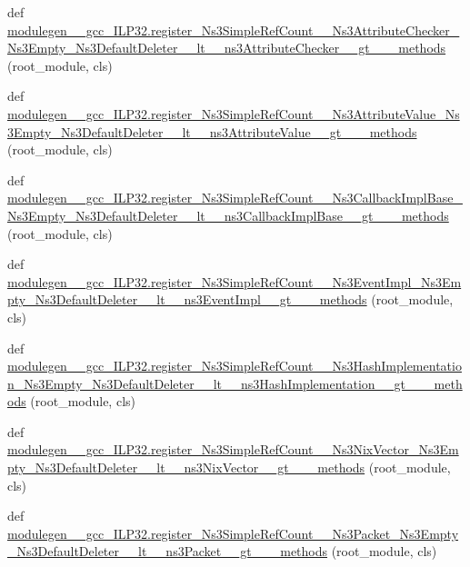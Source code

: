 \begin{DoxyCompactItemize}
\item 
def \hyperlink{namespacemodulegen____gcc__ILP32_a8e35760026d969bed52bf02d5751f184}{modulegen\+\_\+\+\_\+gcc\+\_\+\+I\+L\+P32.\+register\+\_\+\+Ns3\+Simple\+Ref\+Count\+\_\+\+\_\+\+Ns3\+Attribute\+Checker\+\_\+\+Ns3\+Empty\+\_\+\+Ns3\+Default\+Deleter\+\_\+\+\_\+lt\+\_\+\+\_\+ns3\+Attribute\+Checker\+\_\+\+\_\+gt\+\_\+\+\_\+\+\_\+methods} (root\+\_\+module, cls)
\item 
def \hyperlink{namespacemodulegen____gcc__ILP32_ae37f0969d06fd5e11e962c9b2a58d222}{modulegen\+\_\+\+\_\+gcc\+\_\+\+I\+L\+P32.\+register\+\_\+\+Ns3\+Simple\+Ref\+Count\+\_\+\+\_\+\+Ns3\+Attribute\+Value\+\_\+\+Ns3\+Empty\+\_\+\+Ns3\+Default\+Deleter\+\_\+\+\_\+lt\+\_\+\+\_\+ns3\+Attribute\+Value\+\_\+\+\_\+gt\+\_\+\+\_\+\+\_\+methods} (root\+\_\+module, cls)
\item 
def \hyperlink{namespacemodulegen____gcc__ILP32_a1725745354fc64e505a347b59ad09428}{modulegen\+\_\+\+\_\+gcc\+\_\+\+I\+L\+P32.\+register\+\_\+\+Ns3\+Simple\+Ref\+Count\+\_\+\+\_\+\+Ns3\+Callback\+Impl\+Base\+\_\+\+Ns3\+Empty\+\_\+\+Ns3\+Default\+Deleter\+\_\+\+\_\+lt\+\_\+\+\_\+ns3\+Callback\+Impl\+Base\+\_\+\+\_\+gt\+\_\+\+\_\+\+\_\+methods} (root\+\_\+module, cls)
\item 
def \hyperlink{namespacemodulegen____gcc__ILP32_a8101c8d46fb3608fb9b8e22e680f1793}{modulegen\+\_\+\+\_\+gcc\+\_\+\+I\+L\+P32.\+register\+\_\+\+Ns3\+Simple\+Ref\+Count\+\_\+\+\_\+\+Ns3\+Event\+Impl\+\_\+\+Ns3\+Empty\+\_\+\+Ns3\+Default\+Deleter\+\_\+\+\_\+lt\+\_\+\+\_\+ns3\+Event\+Impl\+\_\+\+\_\+gt\+\_\+\+\_\+\+\_\+methods} (root\+\_\+module, cls)
\item 
def \hyperlink{namespacemodulegen____gcc__ILP32_a59dad6cf46a3eb90ab74f8388a4708b9}{modulegen\+\_\+\+\_\+gcc\+\_\+\+I\+L\+P32.\+register\+\_\+\+Ns3\+Simple\+Ref\+Count\+\_\+\+\_\+\+Ns3\+Hash\+Implementation\+\_\+\+Ns3\+Empty\+\_\+\+Ns3\+Default\+Deleter\+\_\+\+\_\+lt\+\_\+\+\_\+ns3\+Hash\+Implementation\+\_\+\+\_\+gt\+\_\+\+\_\+\+\_\+methods} (root\+\_\+module, cls)
\item 
def \hyperlink{namespacemodulegen____gcc__ILP32_acf2fe3353b3614ad36d5edc27d55dc08}{modulegen\+\_\+\+\_\+gcc\+\_\+\+I\+L\+P32.\+register\+\_\+\+Ns3\+Simple\+Ref\+Count\+\_\+\+\_\+\+Ns3\+Nix\+Vector\+\_\+\+Ns3\+Empty\+\_\+\+Ns3\+Default\+Deleter\+\_\+\+\_\+lt\+\_\+\+\_\+ns3\+Nix\+Vector\+\_\+\+\_\+gt\+\_\+\+\_\+\+\_\+methods} (root\+\_\+module, cls)
\item 
def \hyperlink{namespacemodulegen____gcc__ILP32_a0ef742c28dd795a6ce9adfeac1b275b8}{modulegen\+\_\+\+\_\+gcc\+\_\+\+I\+L\+P32.\+register\+\_\+\+Ns3\+Simple\+Ref\+Count\+\_\+\+\_\+\+Ns3\+Packet\+\_\+\+Ns3\+Empty\+\_\+\+Ns3\+Default\+Deleter\+\_\+\+\_\+lt\+\_\+\+\_\+ns3\+Packet\+\_\+\+\_\+gt\+\_\+\+\_\+\+\_\+methods} (root\+\_\+module, cls)

\end{DoxyCompactItemize}
